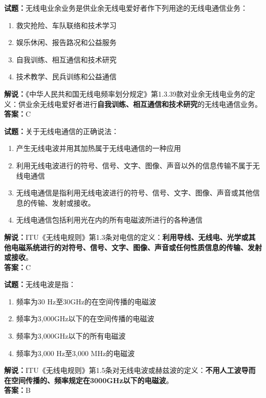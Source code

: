 \documentclass{ctexbook}
\begin{document}
\vspace{\baselineskip}

\noindent\textbf{试题：}无线电业余业务是供业余无线电爱好者作下列用途的无线电通信业务：
\begin{enumerate}[leftmargin=3em]
  \item 救灾抢险、车队联络和技术学习
  \item 娱乐休闲、报告路况和公益服务
  \item 自我训练、相互通信和技术研究
  \item 技术教学、民兵训练和公益通信
\end{enumerate}
\noindent\textbf{解说：}《中华人民共和国无线电频率划分规定》第1.3.39款对业余无线电业务的定义：供业余无线电爱好者进行\textbf{自我训练、相互通信和技术研究}的无线电通信业务。\\\noindent\textbf{答案：}C

\vspace{\baselineskip}

\noindent\textbf{试题：}关于无线电通信的正确说法：
\begin{enumerate}[leftmargin=3em]
  \item 产生无线电波并用其加热属于无线电通信的一种应用
  \item 利用无线电波进行的符号、信号、文字、图像、声音以外的信息传输不属于无线电通信
  \item 无线电通信是指利用无线电波进行的符号、信号、文字、图像、声音或其他信息的传输、发射或接收。
  \item 无线电通信包括利用光在内的所有电磁波所进行的各种通信
\end{enumerate}
\noindent\textbf{解说：}ITU《无线电规则》第1.3条对电信的定义：\textbf{利用导线、无线电、光学或其他电磁系统进行的对符号、信号、文字、图像、声音或任何性质信息的传输、发射或接收}。\\\noindent\textbf{答案：}C


\vspace{\baselineskip}

\noindent\textbf{试题：}无线电波是指：
\begin{enumerate}[leftmargin=3em]
  \item 频率为30 \si{Hz}至30\unit{\GHz}的在空间传播的电磁波
  \item 频率为3,000\unit{\GHz}以下的在空间传播的电磁波
  \item 频率为3,000\unit{\GHz}以下的所有电磁波
  \item 频率为3,000 \si{Hz}至3,000 \unit{\MHz}的电磁波
\end{enumerate}
\noindent\textbf{解说：}ITU《无线电规则》第1.5条对无线电波或赫兹波的定义：\textbf{不用人工波导而在空间传播的、频率规定在3000\unit{\GHz}以下的电磁波}。\\\noindent\textbf{答案：}B
\end{document}
